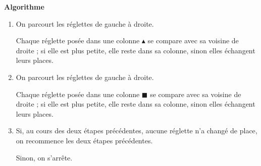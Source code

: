 \documentclass{article}
\newcommand*\circled[1]{\tikz[baseline=(char.base)]{
        \node[shape=circle,draw,minimum size=5mm, inner sep=1pt,fill=white] (char)
        {\rule[-0.5pt]{-2.6pt}{\dimexpr2ex+0pt}#1};}}
\newcommand{\trianglet}[2]
{\begin{scope}[xshift=#1,yshift=#2,scale=1.1]\draw[fill=black] (-1/4,0) -- (1/4,0) -- (0, {sqrt(3)/4}) -- cycle;\end{scope}}
\newcommand{\carret}[2]
{\begin{scope}[xshift=#1,yshift=#2,scale=1.1]\draw[rotate=0,fill=black] (-1/4,0) -- (1/4,0) -- (1/4, 1/2) -- (-1/4,1/2) -- cycle;\end{scope}}
\begin{document}
\vfill


\begin{center}
\end{center}

\newpage

\begin{center}
{\Huge \bf Algorithme}
\end{center}
{\Huge
\begin{enumerate}
\item On parcourt les réglettes de gauche à droite.

Chaque réglette posée dans une colonne $\blacktriangle$ se compare avec sa voisine de droite ; si elle est plus petite, elle reste dans sa colonne, sinon elles échangent leurs places.

\item On parcourt les réglettes de gauche à droite.

Chaque réglette posée dans une colonne $\blacksquare$ se compare avec sa voisine de droite ; si elle est plus petite, elle reste dans sa colonne, sinon elles échangent leurs places.

\item Si, au cours des deux étapes précédentes, aucune réglette n'a changé de place, on recommence les deux étapes précédentes.

Sinon, on s'arrête.
\end{enumerate}
}
\end{document}
